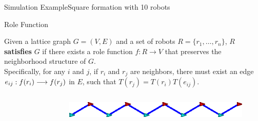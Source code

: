 \documentclass[10pt]{beamer}
\begin{document}
\begin{frame}{Simulation Example}{Square formation with 10 robots}
  \begin{center}
  \end{center}
\end{frame}

\begin{frame}{Role Function}
  \begin{definition}
    \small{Given a lattice graph $G=(V, E)$ and a set of robots $R = \{
    r_1, \ldots, r_n \}$, $R$ \textbf{satisfies} $G$ if
    there exists a role function $f: R \rightarrow V$ that preserves
    the neighborhood structure of $G$.
    \\
    Specifically, for any $i$ and $j$, if $r_i$ and $r_j$ are neighbors, 
    there must exist an edge
    $e_{ij}: {f(r_i)}\overset{}{\longrightarrow}{f(r_j)}$ in $E$, such that
    $ T(r_j) = T(r_i) T(e_{ij})$.}
  \end{definition}
  \begin{columns}[T] 
    \begin{column}{.4\textwidth}
      \begin{figure}
        \centering
      \end{figure}
    \end{column}%
    \begin{column}{.5\textwidth}
      \begin{figure}
        \centering
        \includegraphics[width=0.75\linewidth]{figs/bad-hexagon}

\end{figure}
\end{column}
\end{columns}
\end{frame}
\end{document}
